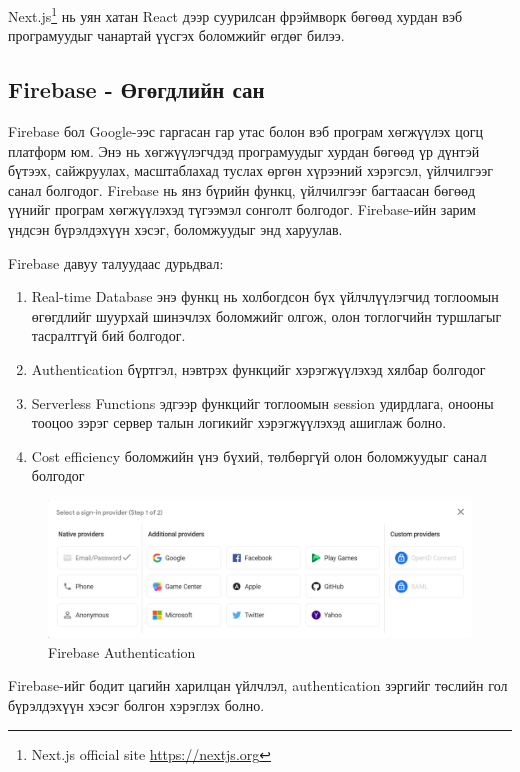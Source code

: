 Next.js\footnote{Next.js official site \url{https://nextjs.org}} нь уян хатан React дээр суурилсан фрэймворк бөгөөд хурдан вэб програмуудыг чанартай үүсгэх боломжийг өгдөг билээ. 


\subsection{Firebase - Өгөгдлийн сан}

Firebase бол Google-ээс гаргасан гар утас болон вэб програм хөгжүүлэх цогц платформ юм. Энэ нь хөгжүүлэгчдэд програмуудыг хурдан бөгөөд үр дүнтэй бүтээх, сайжруулах, масштаблахад туслах өргөн хүрээний хэрэгсэл, үйлчилгээг санал болгодог. Firebase нь янз бүрийн функц, үйлчилгээг багтаасан бөгөөд үүнийг програм хөгжүүлэхэд түгээмэл сонголт болгодог. Firebase-ийн зарим үндсэн бүрэлдэхүүн хэсэг, боломжуудыг энд харуулав.


Firebase давуу талуудаас дурьдвал:
\begin{enumerate}
	\item Real-time Database энэ функц нь холбогдсон бүх үйлчлүүлэгчид тоглоомын өгөгдлийг шуурхай шинэчлэх боломжийг олгож, олон тоглогчийн туршлагыг тасралтгүй бий болгодог.
	\item Authentication бүртгэл, нэвтрэх функцийг хэрэгжүүлэхэд хялбар болгодог
	\item Serverless Functions эдгээр функцийг тоглоомын session удирдлага, онооны тооцоо зэрэг сервер талын логикийг хэрэгжүүлэхэд ашиглаж болно.
	\item Cost efficiency боломжийн үнэ бүхий, төлбөргүй олон боломжуудыг санал болгодог
\end{enumerate}

\begin{figure}[h]
	\centering
	\includegraphics[width=15cm]{images/firebase_auth.png}
	\caption{Firebase Authentication}
	\label{fig:prisma}
\end{figure}

Firebase-ийг бодит цагийн харилцан үйлчлэл, authentication зэргийг төслийн гол бүрэлдэхүүн хэсэг болгон хэрэглэх болно.

